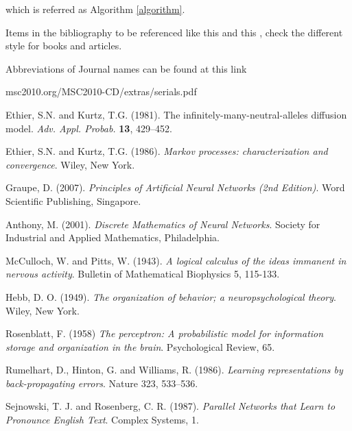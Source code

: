 \documentclass[%
    corpo=11pt,
    twoside,
    stile=classica,
    oldstyle,
    autoretitolo,
    tipotesi=magistrale,
    greek,
    evenboxes,
    english
]{toptesi}
\begin{document}
which is referred as Algorithm \ref{algorithm}. 







\newpage
Items in the bibliography to be referenced like this \cite{EK86} and this \cite{EK81}, check the different style for books and articles. 

Abbreviations of Journal names can be found at this link

msc2010.org/MSC2010-CD/extras/serials.pdf




\begin{thebibliography}{99}

  {\sc Ethier, S.N.} and {\sc Kurtz, T.G.} (1981). The infinitely-many-neutral-alleles diffusion model. {\em Adv. Appl. Probab.} {\bf 13}, 429--452.

  {\sc Ethier, S.N.} and {\sc Kurtz, T.G.} (1986). \emph{Markov processes: characterization and convergence}. Wiley, New York.

 {\sc Graupe, D.} (2007). \textit{Principles of Artificial Neural Networks (2nd Edition)}. Word Scientific Publishing, Singapore.
 
 {\sc Anthony, M. } (2001). \textit{Discrete Mathematics of Neural Networks}. Society for Industrial and Applied Mathematics, Philadelphia.

 {\sc McCulloch, W.} and {\sc Pitts, W}. (1943). \textit{A logical calculus of the ideas immanent in nervous activity}. Bulletin of Mathematical Biophysics 5, 115-133.

 {\sc Hebb, D. O.} (1949). \textit{The organization of behavior; a neuropsychological theory}. Wiley, New York.

 {\sc Rosenblatt, F.} (1958) \textit{The perceptron: A probabilistic model for information storage and organization in the brain}. Psychological Review, 65.

 {\sc Rumelhart, D.}, {\sc Hinton, G.} and {\sc Williams, R.} (1986). \textit{Learning representations by back-propagating errors}. Nature 323, 533–536.

 {\sc Sejnowski, T. J.} and {\sc Rosenberg, C. R.} (1987). \textit{Parallel Networks that Learn to Pronounce English Text}. Complex Systems, 1.


\end{thebibliography}
\end{document}
